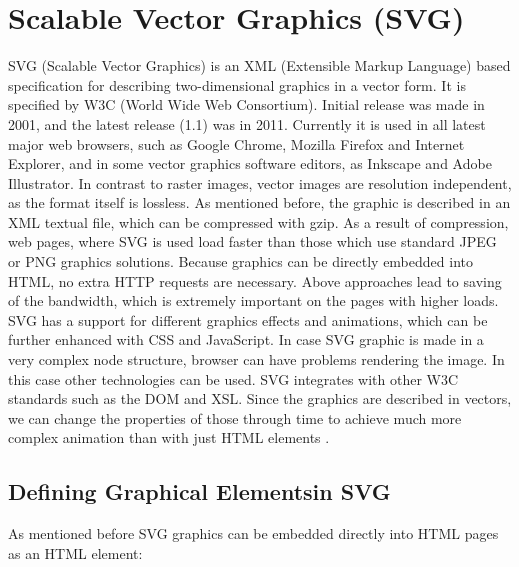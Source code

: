 %
%
% 
% 
% 


\section{Scalable Vector Graphics (SVG)}
\label{sect:SVG}
SVG (Scalable Vector Graphics) is an XML (Extensible Markup Language) based specification for describing two-dimensional graphics in a vector form. It is specified by W3C (World Wide Web Consortium). Initial release was made in 2001, and the latest release (1.1) was in 2011. Currently it is used in all latest major web browsers, such as Google Chrome, Mozilla Firefox and Internet Explorer, and in some vector graphics software editors, as Inkscape and Adobe Illustrator. In contrast to raster images, vector images are resolution independent, as the format itself is lossless. As mentioned before, the graphic is described in an XML textual file, which can be compressed with gzip. As a result of compression, web pages, where SVG is used load faster than those which use standard JPEG or PNG graphics solutions. Because graphics can be directly embedded into HTML, no extra HTTP requests are necessary. Above approaches lead to saving of the bandwidth, which is extremely important on the pages with higher loads. SVG has a support for different graphics effects and animations, which can be further enhanced with CSS and JavaScript. In case SVG graphic is made in a very complex node structure, browser can have problems rendering the image. In this case other technologies can be used. SVG integrates with other W3C standards such as the DOM and XSL. Since the graphics are described in vectors, we can change the properties of those through time to achieve much more complex animation than with just HTML elements \citep{w3schoolSVG}. 

\subsection{Defining Graphical Elementsin SVG} %
\label{sub:SVG_basic_elemnts}
As mentioned before SVG graphics can be embedded directly into HTML pages as an HTML element:

